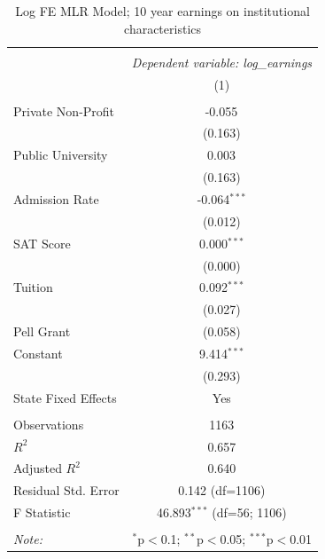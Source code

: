 \begin{table}[!htbp] \centering
  \caption{Log FE MLR Model; 10 year earnings on institutional characteristics}
\begin{tabular}{@{\extracolsep{5pt}}lc}
\\[-1.8ex]\hline
\hline \\[-1.8ex]
& \multicolumn{1}{c}{\textit{Dependent variable: log_earnings}} \
\cr \cline{2-2}
\\[-1.8ex] & (1) \\
\hline \\[-1.8ex]
 Private Non-Profit & -0.055$^{}$ \\
& (0.163) \\
 Public University & 0.003$^{}$ \\
& (0.163) \\
 Admission Rate & -0.064$^{***}$ \\
& (0.012) \\
 SAT Score & 0.000$^{***}$ \\
& (0.000) \\
 Tuition & 0.092$^{***}$ \\
& (0.027) \\
 Pell Grant %
& (0.058) \\
 Constant & 9.414$^{***}$ \\
& (0.293) \\
 State Fixed Effects & Yes \\
\hline \\[-1.8ex]
 Observations & 1163 \\
 $R^2$ & 0.657 \\
 Adjusted $R^2$ & 0.640 \\
 Residual Std. Error & 0.142 (df=1106) \\
 F Statistic & 46.893$^{***}$ (df=56; 1106) \\
\hline
\hline \\[-1.8ex]
\textit{Note:} & \multicolumn{1}{r}{$^{*}$p$<$0.1; $^{**}$p$<$0.05; $^{***}$p$<$0.01} \\
\end{tabular}
\end{table}